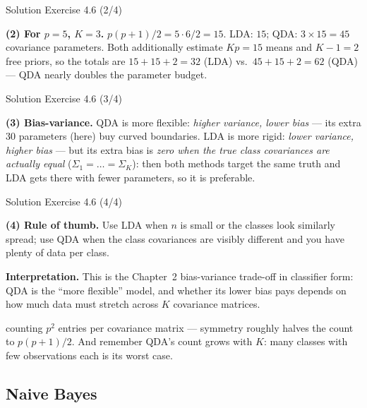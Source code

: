 \documentclass[aspectratio=169,11pt]{beamer}
\begin{document}
\begin{frame}{Solution \textemdash{} Exercise 4.6 (2/4)}
\begin{solutionbox}
\textbf{(2) For $p=5$, $K=3$.}
$p(p+1)/2 = 5\cdot 6/2 = 15$. LDA: $15$; QDA: $3\times 15 = 45$
covariance parameters. Both additionally estimate $Kp=15$ means and
$K-1=2$ free priors, so the totals are $15+15+2=32$ (LDA) vs.\
$45+15+2=62$ (QDA) --- QDA nearly doubles the parameter budget.
\end{solutionbox}
\end{frame}

\begin{frame}{Solution \textemdash{} Exercise 4.6 (3/4)}
\begin{solutionbox}
\textbf{(3) Bias-variance.}
QDA is more flexible: \emph{higher variance, lower bias} --- its extra
$30$ parameters (here) buy curved boundaries. LDA is more
rigid: \emph{lower variance, higher bias} --- but its extra bias is
\emph{zero when the true class covariances are actually equal}
($\Sigma_1=\dots=\Sigma_K$): then both methods target the same truth
and LDA gets there with fewer parameters, so it is preferable.

\vspace{1mm}
\end{solutionbox}
\end{frame}

\begin{frame}{Solution \textemdash{} Exercise 4.6 (4/4)}
\begin{solutionbox}
\textbf{(4) Rule of thumb.}
Use LDA when $n$ is small or the classes look similarly spread; use QDA
when the class covariances are visibly different and you have plenty of
data per class.

\vspace{1mm}
\textbf{Interpretation.} This is the Chapter~2 bias-variance trade-off
in classifier form: QDA is the ``more flexible'' model, and whether its
lower bias pays depends on how much data must stretch across
$K$ covariance matrices.
\end{solutionbox}
\begin{mistake}
counting $p^2$ entries per covariance matrix ---
symmetry roughly halves the count to $p(p+1)/2$. And remember QDA's
count grows with $K$: many classes with few observations each is its
worst case.
\end{mistake}
\end{frame}

\subsection{Naive Bayes}
\end{document}
